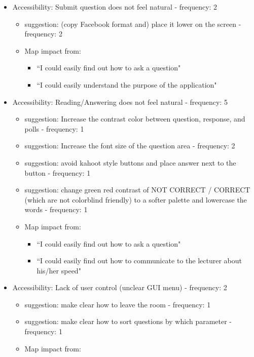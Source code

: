 \documentclass{article}
\begin{document}
\begin{itemize}
    \item Accessibility: Submit question does not feel natural - frequency: 2
    \begin{itemize}
        \item suggestion: (copy Facebook format and) place it lower on the screen - frequency: 2
        \item Map impact from:
        \begin{itemize}
            \item ``I could easily find out how to ask a question"
            \item ``I could easily understand the purpose of the application"
        \end{itemize}
    \end{itemize}
    \item Accessibility: Reading/Answering does not feel natural - frequency: 5
    \begin{itemize}
        \item suggestion: Increase the contrast color between question, response, and polls - frequency: 1
        \item suggestion: Increase the font size of the question area - frequency: 2 
        \item suggestion: avoid kahoot style buttons and place answer next to the button - frequency: 1
        \item suggestion: change green red contrast of NOT CORRECT / CORRECT (which are not colorblind friendly) to a softer palette and lowercase the words - frequency: 1
        \item Map impact from:
        \begin{itemize}
            \item ``I could easily find out how to ask a question"
            \item ``I could easily find out how to communicate to the lecturer about his/her speed"
        \end{itemize}
    \end{itemize}
    \item Accessibility: Lack of user control (unclear GUI menu) - frequency: 2
    \begin{itemize}
        \item suggestion: make clear how to leave the room - frequency: 1
        \item suggestion: make clear how to sort questions by which parameter - frequency: 1
        \item Map impact from:

\end{itemize}
\end{itemize}
\end{document}
